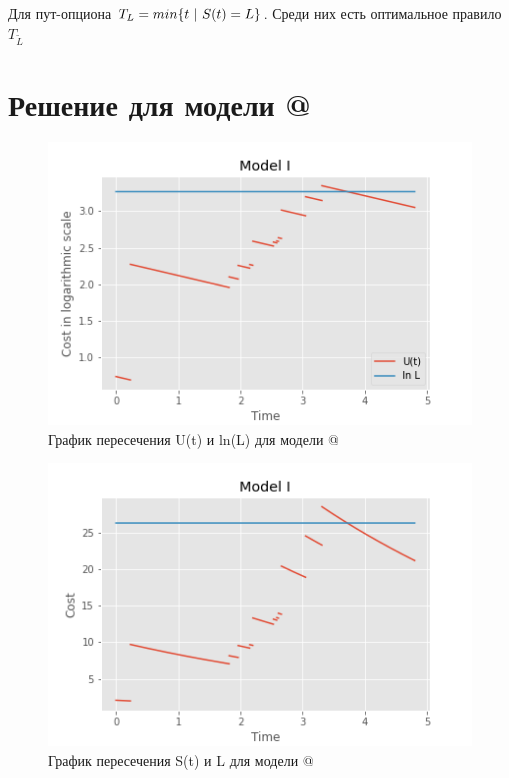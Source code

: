 \documentclass[a4paper,12pt]{article}
\makeatletter
\theoremstyle{definition}
\newcommand*{\rom}[1]{\expandafter\@slowromancap\romannumeral #1@}
\makeatother
\begin{document}
Для пут-опциона $T_L = min \{t\textup{ | }S(t) = L\}$. Среди них есть оптимальное правило $T_{\tilde{L}}$

\section{Решение для модели \rom{1}}


\begin{figure}[htbp]
\label{fig:model1tracklcrosslog}
\centerline{\includegraphics[scale=0.7]{img/model1_with_L_log.png}}
\caption{График пересечения U(t) и ln(L) для модели \rom{1}}
\end{figure}


\begin{figure}[htbp]
\label{fig:model1tracklcross}
\centerline{\includegraphics[scale=0.7]{img/model1_with_L.png}}
\caption{График пересечения S(t) и L для модели \rom{1}}
\end{figure}
\end{document}
